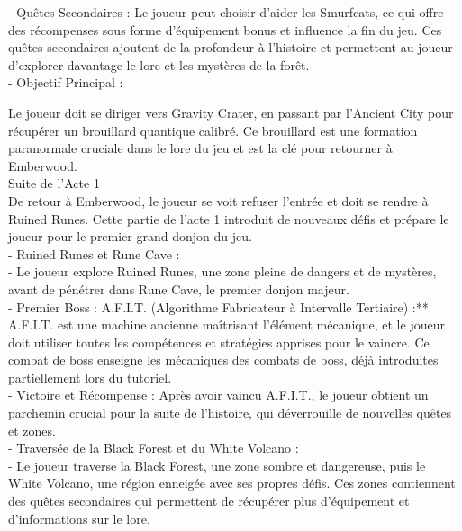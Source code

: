 - Quêtes Secondaires : Le joueur peut choisir d'aider les Smurfcats, ce qui offre des récompenses sous forme d'équipement bonus et influence la fin du jeu.
Ces quêtes secondaires ajoutent de la profondeur à l'histoire et permettent au joueur d'explorer davantage le lore et les mystères de la forêt.
\\



- Objectif Principal :

Le joueur doit se diriger vers Gravity Crater, en passant par l'Ancient City pour récupérer un brouillard quantique calibré. Ce brouillard est une formation paranormale cruciale dans le lore du jeu et est la clé pour retourner à Emberwood.
\\

Suite de l'Acte 1
\\

De retour à Emberwood, le joueur se voit refuser l'entrée et doit se rendre à Ruined Runes. Cette partie de l'acte 1 introduit de nouveaux défis et prépare le joueur pour le premier grand donjon du jeu.
\\

- Ruined Runes et Rune Cave :
\\

- Le joueur explore Ruined Runes, une zone pleine de dangers et de mystères, avant de pénétrer dans Rune Cave, le premier donjon majeur.
\\

- Premier Boss : A.F.I.T. (Algorithme Fabricateur à Intervalle Tertiaire) :** A.F.I.T. est une machine ancienne maîtrisant l'élément mécanique, et le joueur doit utiliser toutes les compétences et stratégies apprises pour le vaincre. Ce combat de boss enseigne les mécaniques des combats de boss, déjà introduites partiellement lors du tutoriel.
\\

- Victoire et Récompense : Après avoir vaincu A.F.I.T., le joueur obtient un parchemin crucial pour la suite de l'histoire, qui déverrouille de nouvelles quêtes et zones.
\\

- Traversée de la Black Forest et du White Volcano :
\\

- Le joueur traverse la Black Forest, une zone sombre et dangereuse, puis le White Volcano, une région enneigée avec ses propres défis. Ces zones contiennent des quêtes secondaires qui permettent de récupérer plus d'équipement et d'informations sur le lore.
\\

